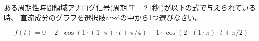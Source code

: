 ある周期性時間領域アナログ信号(周期 $\textrm{T} = 2$ [秒])が以下の式で与えられている時、
直流成分のグラフを選択肢a〜dの中から1つ選びなさい。

\[
f(t) = 
0
+ 2 \cdot \cos( 1 \cdot (1\cdot \pi) \cdot t + \pi/4 )
- 1 \cdot \cos( 2 \cdot (1\cdot \pi) \cdot t + \pi/2 )
\]
